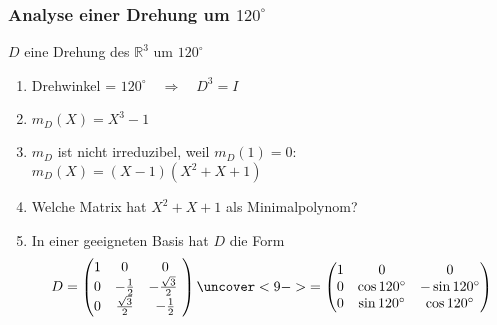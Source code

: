 %
%
%
\begin{frame}[t]
\frametitle{Analyse einer Drehung um $120^\circ$}
$D$ eine Drehung des $\mathbb{R}^3$ um $120^\circ$
\begin{enumerate}
\item<2->
Drehwinkel = $120^\circ\quad\Rightarrow\quad D^3 = I$
\item<4->
$m_D(X)=X^3-1$
\item<5->
$m_D$ ist nicht irreduzibel, weil $m_D(1)=0$:
$
m_D(X) = (X-1)(X^2+X+1)
$
\item<6->
Welche Matrix hat $X^2+X+1$ als Minimalpolynom?
\item<8-> In einer geeigneten Basis hat $D$ die Form
\[
D=\begin{pmatrix}
1&0&0\\
0&-\frac12 & -\frac{\sqrt{3}}2 \\
0&\frac{\sqrt{3}}2 & -\frac12
\end{pmatrix}
\uncover<9->{=
\begin{pmatrix}
1&0&0\\
0&\cos 120^\circ & -\sin 120^\circ\\
0&\sin 120^\circ & \cos 120^\circ
\end{pmatrix}}
\]
\end{enumerate}
\end{frame}
